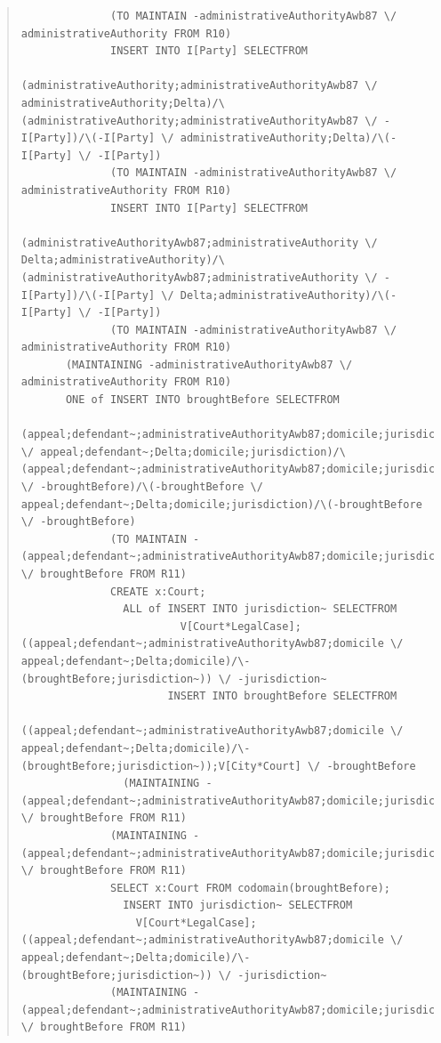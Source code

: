 \documentclass[10pt,a4paper]{report}              %
\theoremstyle{plain}\theorembodyfont{\rmfamily}\newtheorem{definition}{Definition}[section]
\theoremstyle{plain}\theorembodyfont{\rmfamily}\newtheorem{designrule}[definition]{Requirement}
\begin{document}
\begin{quote}
\begin{verbatim}
              (TO MAINTAIN -administrativeAuthorityAwb87 \/ administrativeAuthority FROM R10)
              INSERT INTO I[Party] SELECTFROM
                (administrativeAuthority;administrativeAuthorityAwb87 \/ administrativeAuthority;Delta)/\(administrativeAuthority;administrativeAuthorityAwb87 \/ -I[Party])/\(-I[Party] \/ administrativeAuthority;Delta)/\(-I[Party] \/ -I[Party])
              (TO MAINTAIN -administrativeAuthorityAwb87 \/ administrativeAuthority FROM R10)
              INSERT INTO I[Party] SELECTFROM
                (administrativeAuthorityAwb87;administrativeAuthority \/ Delta;administrativeAuthority)/\(administrativeAuthorityAwb87;administrativeAuthority \/ -I[Party])/\(-I[Party] \/ Delta;administrativeAuthority)/\(-I[Party] \/ -I[Party])
              (TO MAINTAIN -administrativeAuthorityAwb87 \/ administrativeAuthority FROM R10)
       (MAINTAINING -administrativeAuthorityAwb87 \/ administrativeAuthority FROM R10)
       ONE of INSERT INTO broughtBefore SELECTFROM
                (appeal;defendant~;administrativeAuthorityAwb87;domicile;jurisdiction \/ appeal;defendant~;Delta;domicile;jurisdiction)/\(appeal;defendant~;administrativeAuthorityAwb87;domicile;jurisdiction \/ -broughtBefore)/\(-broughtBefore \/ appeal;defendant~;Delta;domicile;jurisdiction)/\(-broughtBefore \/ -broughtBefore)
              (TO MAINTAIN -(appeal;defendant~;administrativeAuthorityAwb87;domicile;jurisdiction) \/ broughtBefore FROM R11)
              CREATE x:Court;
                ALL of INSERT INTO jurisdiction~ SELECTFROM
                         V[Court*LegalCase];((appeal;defendant~;administrativeAuthorityAwb87;domicile \/ appeal;defendant~;Delta;domicile)/\-(broughtBefore;jurisdiction~)) \/ -jurisdiction~
                       INSERT INTO broughtBefore SELECTFROM
                         ((appeal;defendant~;administrativeAuthorityAwb87;domicile \/ appeal;defendant~;Delta;domicile)/\-(broughtBefore;jurisdiction~));V[City*Court] \/ -broughtBefore
                (MAINTAINING -(appeal;defendant~;administrativeAuthorityAwb87;domicile;jurisdiction) \/ broughtBefore FROM R11)
              (MAINTAINING -(appeal;defendant~;administrativeAuthorityAwb87;domicile;jurisdiction) \/ broughtBefore FROM R11)
              SELECT x:Court FROM codomain(broughtBefore);
                INSERT INTO jurisdiction~ SELECTFROM
                  V[Court*LegalCase];((appeal;defendant~;administrativeAuthorityAwb87;domicile \/ appeal;defendant~;Delta;domicile)/\-(broughtBefore;jurisdiction~)) \/ -jurisdiction~
              (MAINTAINING -(appeal;defendant~;administrativeAuthorityAwb87;domicile;jurisdiction) \/ broughtBefore FROM R11)

\end{verbatim}
\end{quote}
\end{document}
